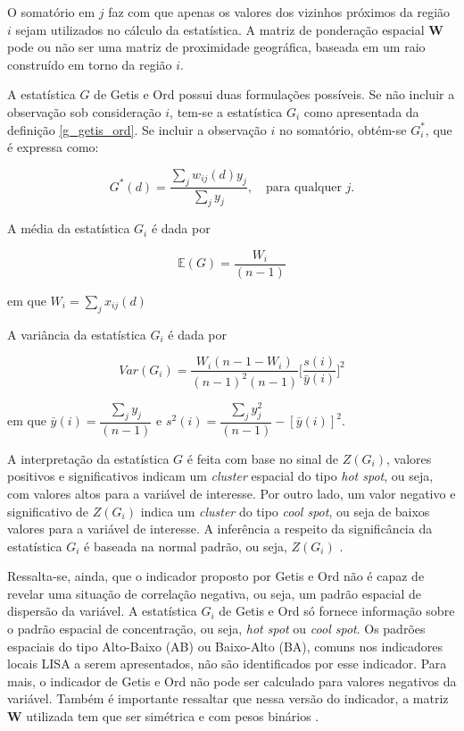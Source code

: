 \documentclass[
	12pt,				%
	openright,			%
	oneside,			%
	a4paper,			%
	chapter=TITLE,		%
	section=TITLE,		%
	english,			%
	french,				%
	spanish,			%
	brazil				%
	]{abntex2}
\begin{document}
O somatório em $j$ faz com que apenas os valores dos vizinhos próximos da região $i$ sejam utilizados no cálculo da estatística. A matriz de ponderação espacial $\boldsymbol{W}$ pode ou não ser uma matriz de proximidade geográfica, baseada em um raio construído em torno da região $i$.

A estatística $G$ de Getis e Ord possui duas formulações possíveis. Se não incluir a observação sob consideração $i$, tem-se a estatística $G_i$ como apresentada da definição \ref{g_getis_ord}. Se incluir a observação $i$ no somatório, obtém-se $G_i^*$, que é expressa como: 

\begin{equation}
G^*(d) = \dfrac{\sum_{j} w_{ij}(d) y_j}{\sum_{j}  y_j},\quad \text{para qualquer } j.
\label{g_getis_ord_s}
\end{equation}

A média da estatística $G_i$ é dada por 

\begin{equation*}
\mathbb{E}(G) = \dfrac{W_i}{(n-1)}  
\end{equation*}

\noindent em que $W_i = \sum_j x_{ij}(d)$

A variância da estatística $G_i$ é dada por  

\begin{equation}
	Var(G_i)= \dfrac{W_i(n-1-W_i)}{(n-1)^2(n-1)} \bigg[\dfrac{s(i)}{\bar{y}(i)}\bigg]^2
\end{equation}

\noindent em que $\bar{y}(i)= \dfrac{\sum_j y_j}{(n-1)}$ e $s^2(i) = \dfrac{\sum_j y_j^2}{(n-1)} - [\bar{y}(i)]^2$. 

A interpretação da estatística $G$ é feita com base no sinal de $Z(G_i)$, valores positivos e significativos indicam um \textit{cluster} espacial do tipo \textit{hot spot}, ou seja, com valores altos para a variável de interesse. Por outro lado, um valor negativo e significativo de $Z(G_i)$ indica um \textit{cluster} do tipo \textit{cool spot}, ou seja de baixos valores para a variável de interesse. A inferência a respeito da significância da estatística $G_i$ é baseada na normal padrão, ou seja, $Z(G_i)$ \cite{almeida12}. 

Ressalta-se, ainda, que o indicador proposto por Getis e Ord não é capaz de revelar uma situação de correlação negativa, ou seja, um padrão espacial de dispersão da variável. A estatística $G_i$ de Getis e Ord só fornece informação sobre o padrão espacial de concentração, ou seja, \textit{hot spot} ou \textit{cool spot}. Os padrões espaciais do tipo Alto-Baixo (AB) ou Baixo-Alto (BA), comuns nos indicadores locais LISA a serem apresentados, não são identificados por esse indicador. Para mais, o indicador de Getis e Ord não pode ser calculado para valores negativos da variável. Também é importante ressaltar que nessa versão do indicador, a matriz $\boldsymbol{W}$ utilizada  tem que ser simétrica e com pesos binários \cite{almeida12}. 
\end{document}
